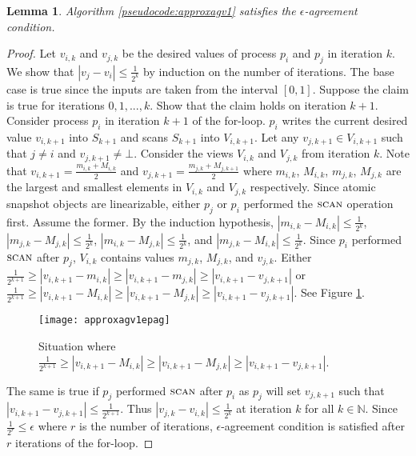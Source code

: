 \documentclass[11pt]{article}
\newcommand\scanF{\textsc{scan}}
\newcommand\N{\mathbb{N}}
\newtheorem{lemma}[theorem]{Lemma}
\begin{document}
\begin{lemma}
\label{lem:agreementv1}
Algorithm \ref{pseudocode:approxagv1} satisfies the $\epsilon$-agreement condition. 
\end{lemma}
\begin{proof}
Let $v_{i,k}$ and $v_{j,k}$ be the desired values of process $p_i$ and $p_j$ in iteration $k$. We show that $|v_j - v_i| \leq \frac{1}{2^{k}}$ by induction on the number of iterations. The base case is true since the inputs are taken from the interval $[0,1]$. Suppose the claim is true for iterations $0, 1, ..., k$. Show that the claim holds on iteration $k+1$. Consider process $p_i$ in iteration $k+1$ of the for-loop. $p_i$ writes the current desired value $v_{i,k+1}$ into $S_{k+1}$ and scans $S_{k+1}$ into $V_{i,k+1}$. Let any $v_{j,k+1}\in V_{i,k+1}$ such that $j \neq i$ and $v_{j,k+1} \neq \bot$. Consider the views $V_{i,k}$ and $V_{j,k}$ from iteration $k$. Note that $v_{i,k+1} = \frac{m_{i,k} + M_{i,k}}{2}$ and $v_{j,k+1} = \frac{m_{j,k} + M_{j,k+1}}{2}$ where $m_{i,k}$, $M_{i,k}$, $m_{j,k}$, $M_{j,k}$ are the largest and smallest elements in $V_{i,k}$ and $V_{j,k}$ respectively. Since atomic snapshot objects are linearizable, either $p_j$ or $p_i$ performed the $\scanF$ operation first. Assume the former. By the induction hypothesis, $|m_{i,k} - M_{i,k}| \leq \frac{1}{2^{k}}$, $|m_{j,k} - M_{j,k}| \leq \frac{1}{2^{k}}$, $|m_{i,k} - M_{j,k}| \leq \frac{1}{2^{k}}$, and $|m_{j,k} - M_{i,k}| \leq \frac{1}{2^{k}}$. Since $p_i$ performed $\scanF$ after $p_j$, $V_{i,k}$ contains values $m_{j,k}$, $M_{j,k}$, and $v_{j,k}$. Either $\frac{1}{2^{k+1}} \geq |v_{i,k+1} - m_{i,k}| \geq |v_{i,k+1} - m_{j,k}| \geq |v_{i,k+1} - v_{j,k+1}|$ or $\frac{1}{2^{k+1}} \geq |v_{i,k+1} - M_{i,k}| \geq |v_{i,k+1} - M_{j,k}| \geq |v_{i,k+1} - v_{j,k+1}|$. See Figure \ref{fig:approxagv1epag}.

\begin{figure}[ht]
\centering
	\texttt{[image: approxagv1epag]}
\caption{Situation where $\frac{1}{2^{k+1}} \geq |v_{i,k+1} - M_{i,k}| \geq |v_{i,k+1} - M_{j,k}| \geq |v_{i,k+1} - v_{j,k+1}|$.}
\label{fig:approxagv1epag}
\end{figure}

The same is true if $p_j$ performed $\scanF$ after $p_i$ as $p_j$ will set $v_{j,k+1}$ such that $|v_{i,k+1}-v_{j,k+1}| \leq \frac{1}{2^{k+1}}$. Thus $|v_{j,k} - v_{i,k}| \leq \frac{1}{2^k}$ at iteration $k$ for all $k \in \N$. Since $\frac{1}{2^r} \leq \epsilon$ where $r$ is the number of iterations, $\epsilon$-agreement condition is satisfied after $r$ iterations of the for-loop. 
\end{proof}
\end{document}
